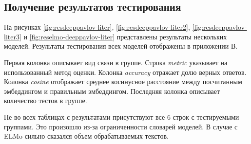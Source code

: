 \documentclass[a4paper,14pt]{article}
\begin{document}
\subsection{Получение результатов тестирования}

На рисунках \ref{fig:resdeeppavlov-liter}, \ref{fig:resdeeppavlov-liter2}, \ref{fig:resdeeppavlov-liter3} и \ref{fig:reselmo-deeppavlov-liter} представлены результаты нескольких моделей.
Результаты тестирования всех моделей отображены в приложении В.

Первая колонка описывает вид связи в группе.
Строка \textit{metric} указывает на использованный метод оценки.
Колонка \textit{accuracy} отражает долю верных ответов.
Колонка \textit{cosine} отображает среднее косинусное расстояние между посчитанным эмбеддингом и правильным эмбеддингом.
Последняя колонка описывает количество тестов в группе.

Не во всех таблицах с результатами присутствуют все 6 строк с тестируемыми группами.
Это произошло из-за ограниченности словарей моделей.
В случае с ELMo сильно сказался объем обрабатываемых текстов.
\end{document}
